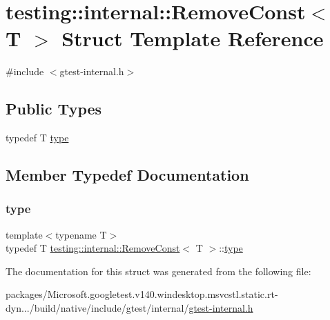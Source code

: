 \hypertarget{structtesting_1_1internal_1_1_remove_const}{}\section{testing\+::internal\+::Remove\+Const$<$ T $>$ Struct Template Reference}
\label{structtesting_1_1internal_1_1_remove_const}


{\ttfamily \#include $<$gtest-\/internal.\+h$>$}

\subsection*{Public Types}
\begin{DoxyCompactItemize}
\item 
typedef T \mbox{\hyperlink{structtesting_1_1internal_1_1_remove_const_a1be32027ea4edcc0d15abd59aba4a97f}{type}}
\end{DoxyCompactItemize}


\subsection{Member Typedef Documentation}
\mbox{\label{structtesting_1_1internal_1_1_remove_const_a1be32027ea4edcc0d15abd59aba4a97f}} 
\subsubsection{\texorpdfstring{type}{type}}
{\footnotesize\ttfamily template$<$typename T$>$ \\
typedef T \mbox{\hyperlink{structtesting_1_1internal_1_1_remove_const}{testing\+::internal\+::\+Remove\+Const}}$<$ T $>$\+::\mbox{\hyperlink{structtesting_1_1internal_1_1_remove_const_a1be32027ea4edcc0d15abd59aba4a97f}{type}}}



The documentation for this struct was generated from the following file\+:\begin{DoxyCompactItemize}
\item 
packages/\+Microsoft.\+googletest.\+v140.\+windesktop.\+msvcstl.\+static.\+rt-\/dyn.../build/native/include/gtest/internal/\mbox{\hyperlink{gtest-internal_8h}{gtest-\/internal.\+h}}\end{DoxyCompactItemize}
